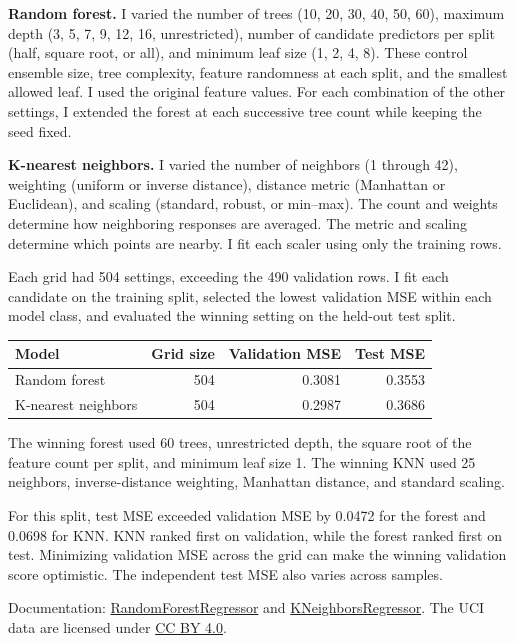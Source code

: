 \documentclass[11pt,letterpaper]{article}
\begin{document}
\textbf{Random forest.}
I varied the number of trees (10, 20, 30, 40, 50, 60), maximum depth
(3, 5, 7, 9, 12, 16, unrestricted), number of candidate predictors per split
(half, square root, or all), and minimum leaf size (1, 2, 4, 8).
These control ensemble size, tree complexity, feature randomness at each
split, and the smallest allowed leaf. I used the original feature values.
For each combination of the other settings, I extended the forest at each
successive tree count while keeping the seed fixed.

\textbf{K-nearest neighbors.}
I varied the number of neighbors (1 through 42), weighting (uniform or
inverse distance), distance metric (Manhattan or Euclidean), and scaling
(standard, robust, or min--max). The count and weights determine how
neighboring responses are averaged. The metric and scaling determine which
points are nearby. I fit each scaler using only the training rows.

Each grid had 504 settings, exceeding the 490 validation rows. I fit each
candidate on the training split, selected the lowest validation MSE within
each model class, and evaluated the winning setting on the held-out test split.

\begin{center}
\begin{tabular}{lrrr}
\toprule
Model & Grid size & Validation MSE & Test MSE \\
\midrule
Random forest & 504 & 0.3081 & 0.3553 \\
K-nearest neighbors & 504 & 0.2987 & 0.3686 \\
\bottomrule
\end{tabular}
\end{center}

The winning forest used 60 trees, unrestricted depth, the square root of the
feature count per split, and minimum leaf size 1. The winning KNN used
25 neighbors, inverse-distance weighting, Manhattan distance, and standard scaling.

For this split, test MSE exceeded validation MSE by 0.0472 for the forest and
0.0698 for KNN. KNN ranked first on validation, while the forest ranked first
on test. Minimizing validation MSE across the grid can make the winning
validation score optimistic. The independent test MSE also varies across samples.

Documentation:
\href{https://scikit-learn.org/stable/modules/generated/sklearn.ensemble.RandomForestRegressor.html}{RandomForestRegressor}
and
\href{https://scikit-learn.org/stable/modules/generated/sklearn.neighbors.KNeighborsRegressor.html}{KNeighborsRegressor}.
The UCI data are licensed under \href{https://creativecommons.org/licenses/by/4.0/}{CC BY 4.0}.
\end{document}
